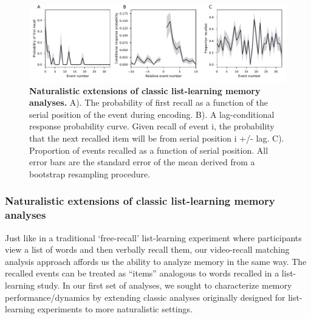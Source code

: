 \documentclass{article}
\begin{document}
{\begin{figure}[t!]
\centering
\includegraphics[width=1\textwidth]{figs/3_list_learning.pdf}
\caption{\small \textbf{Naturalistic extensions of classic list-learning memory analyses.} A). The probability of first recall as a function of the serial position of the event during encoding. B). A lag-conditional response probability curve. Given recall of event i, the probability that the next recalled item will be from serial position i +/- lag. C). Proportion of events recalled as a function of serial position. All error bars are the standard error of the mean derived from a bootstrap resampling procedure.}
\label{fig:list-learning}
\end{figure}

\subsubsection{Naturalistic extensions of classic list-learning memory analyses}
Just like in a traditional `free-recall' list-learning experiment where participants view a list of words and then verbally recall them, our video-recall matching analysis approach affords us the ability to analyze memory in the same way. The recalled events can be treated as ``items'' analogous to words recalled in a list-learning study. In our first set of analyses, we sought to characterize memory performance/dynamics by extending classic analyses originally designed for list-learning experiments to more naturalistic settings.

}
\end{document}
